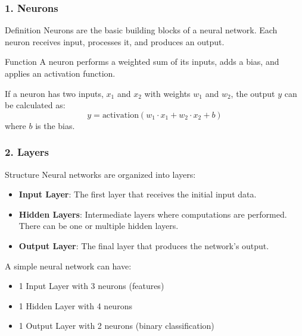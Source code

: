 \documentclass[aspectratio=169]{beamer}
\begin{document}
\begin{frame}[fragile]
  \frametitle{1. Neurons}
  \begin{block}{Definition}
    Neurons are the basic building blocks of a neural network. Each neuron receives input, processes it, and produces an output.
  \end{block}
  
  \begin{block}{Function}
    A neuron performs a weighted sum of its inputs, adds a bias, and applies an activation function.
  \end{block}

  \begin{example}
    If a neuron has two inputs, \( x_1 \) and \( x_2 \) with weights \( w_1 \) and \( w_2 \), the output \( y \) can be calculated as:
    \begin{equation}
      y = \text{activation}(w_1 \cdot x_1 + w_2 \cdot x_2 + b)
    \end{equation}
    where \( b \) is the bias.
  \end{example}
\end{frame}

\begin{frame}[fragile]
  \frametitle{2. Layers}
  \begin{block}{Structure}
    Neural networks are organized into layers:
    \begin{itemize}
      \item \textbf{Input Layer}: The first layer that receives the initial input data.
      \item \textbf{Hidden Layers}: Intermediate layers where computations are performed. There can be one or multiple hidden layers.
      \item \textbf{Output Layer}: The final layer that produces the network's output.
    \end{itemize}
  \end{block}

  \begin{example}
    A simple neural network can have:
    \begin{itemize}
      \item 1 Input Layer with 3 neurons (features)
      \item 1 Hidden Layer with 4 neurons
      \item 1 Output Layer with 2 neurons (binary classification)
    \end{itemize}
  \end{example}
\end{frame}
\end{document}

